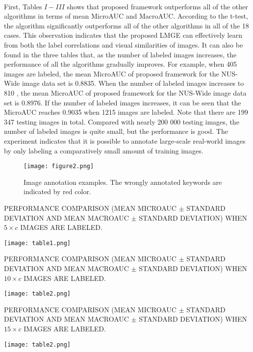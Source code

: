 \documentclass[a4paper,11pt]{report}
\begin{document}
\paragraph{}
First,  Tables $ I - III $  shows that proposed framework  outperforms all of the other algorithms in
terms of mean MicroAUC and MacroAUC. According to the
t-test, the algorithm significantly outperforms all of the other
algorithms in all of the 18 cases. This observation indicates that
the proposed LMGE can effectively learn from both the label
correlations and visual similarities of images.
It can also be found in the three tables that, as the number
of labeled images increases, the performance of all the algorithms
gradually improves. For example, when 405 images
are labeled, the mean MicroAUC of proposed framework for the NUS-Wide image data set is 0.8835. When the number of labeled
images increases to 810 , the mean MicroAUC
of proposed  framework for the NUS-Wide image data set is 0.8976.
If  the number of labeled images increases, it
can be seen that the MicroAUC reaches 0.9035 when 1215
images are labeled. Note that there are 199 347 testing images
in total. Compared with nearly 200 000 testing images, the
number of labeled images is quite small, but the performance
is good. The experiment indicates that it is possible to annotate
large-scale real-world images by only labeling a comparatively
small amount of training images.
\begin{figure} [ht]
 \centering
\texttt{[image: figure2.png]}
\caption{Image annotation examples. The wrongly annotated keywords are indicated by red color.}
\end{figure}
\begin{table}[H]
\centering
\tiny\caption{PERFORMANCE COMPARISON (MEAN MICROAUC $\pm$ STANDARD DEVIATION AND MEAN MACROAUC $\pm$ STANDARD DEVIATION) WHEN $5\times c$ IMAGES ARE
LABELED. }
\texttt{[image: table1.png]}
\end{table}

\begin{table}[H]
\centering
\tiny\caption{PERFORMANCE COMPARISON (MEAN MICROAUC $\pm$ STANDARD DEVIATION AND MEAN MACROAUC $\pm$ STANDARD DEVIATION) WHEN $10\times c$ IMAGES ARE
LABELED. }
\texttt{[image: table2.png]}
\end{table}
\begin{table}[H]
\centering
\tiny\caption{PERFORMANCE COMPARISON (MEAN MICROAUC $\pm$ STANDARD DEVIATION AND MEAN MACROAUC $\pm$ STANDARD DEVIATION) WHEN $15\times c$ IMAGES ARE
LABELED. }
\texttt{[image: table2.png]}
\end{table}
\end{document}
